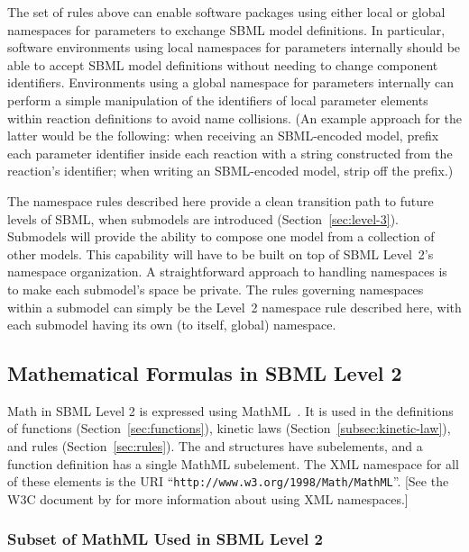 \documentclass[10pt,twocolumntoc]{cekarticle}
\begin{document}
The set of rules above can enable software packages using either
local or global namespaces for parameters to exchange SBML model definitions. In particular, software environments using local namespaces for parameters
internally should be able to accept SBML model definitions without
needing to change component identifiers. Environments using a
global namespace for parameters internally can perform a simple manipulation of the identifiers of local parameter elements within reaction definitions to avoid name collisions.  (An example approach for the latter would be the
following: when receiving an SBML-encoded model, prefix each
parameter identifier inside each reaction with a string constructed from the
reaction's identifier; when writing an SBML-encoded model, strip
off the prefix.)

The namespace rules described here provide a clean transition path
to future levels of SBML, when submodels are introduced
(Section~\ref{sec:level-3}).  Submodels will provide the ability
to compose one model from a collection of other models.  This
capability will have to be built on top of SBML Level~2's
namespace organization.  A straightforward approach to handling
namespaces is to make each submodel's space be private.  The rules
governing namespaces within a submodel can simply be the Level~2
namespace rule described here, with each submodel having its own
(to itself, global) namespace.

\subsection{Mathematical Formulas in SBML Level 2}
\label{sec:formulas}

Math in SBML Level 2 is expressed using MathML~\citep{w3c:2000b}.  It is
used in the definitions of functions (Section~\ref{sec:functions}), kinetic
laws (Section~\ref{subsec:kinetic-law}), and rules
(Section~\ref{sec:rules}).  The  and 
structures have  subelements, and a function definition has a
single MathML  subelement.  The XML namespace for all of
these elements is the URI ``\texttt{http://www.w3.org/1998/Math/MathML}''.
[See the W3C document by \citet{bray:1999} for more information about using
XML namespaces.]

\subsubsection{Subset of MathML Used in SBML Level 2}
\label{sec:mathmltokens}
\end{document}
